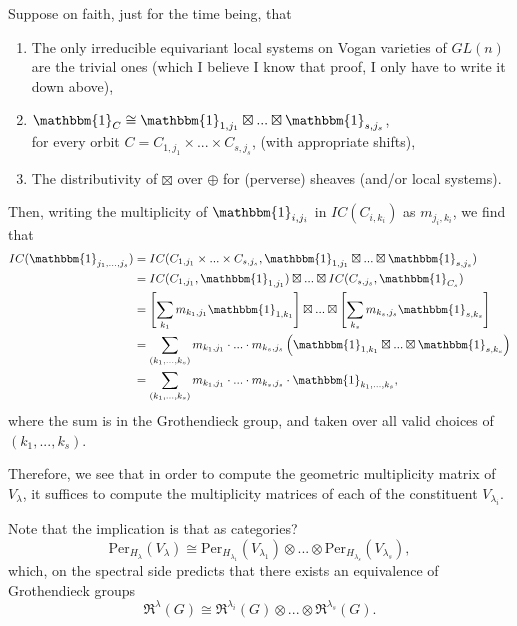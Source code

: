 \documentclass{memoir}
\newcommand{\mf}{\mathfrak}
\newcommand{\lb}{\left(}
\newcommand{\rb}{\right)}
\newcommand{\tx}{\text}
\newcommand{\ten}{\otimes}
\theoremstyle{definition}
\begin{document}
	Suppose on faith, just for the time being, that
	\begin{enumerate}
		\item The only irreducible equivariant local systems on Vogan varieties of $GL(n)$ are the trivial ones (which I believe I know that proof, I only have to write it down above),
		\item $\mathbbm{1}_C\cong \mathbbm{1}_{1,j_1}\boxtimes... \boxtimes\mathbbm{1}_{s,j_s}$,\\
		for every orbit $C=C_{1,j_1}\times... \times C_{s,j_s}$, (with appropriate shifts),
		\item The distributivity of $\boxtimes$ over $\oplus$ for (perverse) sheaves (and/or local systems).
	\end{enumerate}
	
	Then, writing the multiplicity of $\mathbbm{1}_{i,j_i}$ in $IC(C_{i,k_i})$ as $m_{j_i,k_i}$, we find that
	\begin{align*}
		IC(\mathbbm{1}_{j_1, ..., j_s})&=IC(C_{1,j_1}\times... \times C_{s,j_s}, \mathbbm{1}_{1,j_1}\boxtimes... \boxtimes\mathbbm{1}_{s,j_s})\\
		&=IC(C_{1,j_1}, \mathbbm{1}_{1,j_1})\boxtimes... \boxtimes IC(C_{s,j_s}, \mathbbm{1}_{C_s})\\
		&=\left[\sum_{k_1}m_{k_1, j_1}\mathbbm{1}_{1,k_1}\right]\boxtimes... \boxtimes\left[\sum_{k_s}m_{k_s,j_s}\mathbbm{1}_{s,k_s}\right]\\
		&=\sum_{(k_1, ..., k_s)}m_{k_1,j_1}\cdot... \cdot m_{k_s,j_s}\lb\mathbbm{1}_{1,k_1}\boxtimes... \boxtimes \mathbbm{1}_{s,k_s}\rb\\
		&=\sum_{(k_1, ..., k_s)}m_{k_1,j_1}\cdot... \cdot m_{k_s,j_s}\cdot \mathbbm{1}_{k_1, ..., k_s},
	\end{align*}
	where the sum is in the Grothendieck group, and taken over all valid choices of $(k_1, ..., k_s)$.  
	
	Therefore, we see that in order to compute the geometric multiplicity matrix of $V_\lambda$, it suffices to compute the multiplicity matrices of each of the constituent $V_{\lambda_i}$.  
	
	Note that the implication is that as categories?
	$$\tx{Per}_{H_\lambda}(V_\lambda)\cong\tx{Per}_{H_{\lambda_1}}(V_{\lambda_1})\ten... \ten\tx{Per}_{H_{\lambda_s}}(V_{\lambda_s}),$$
	which, on the spectral side predicts that there exists an equivalence of Grothendieck groups
	$$\mf{R}^\lambda(G)\cong\mf{R}^{\lambda_i}(G)\ten... \ten\mf{R}^{\lambda_s}(G).$$
	
\end{document}
